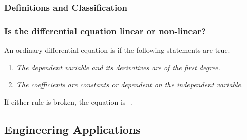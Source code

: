 \documentclass[fleqn]{beamer} %
\newcommand{\sectionIsubsectionItitle}{Definitions and Classification}
\newcommand{\sectionIsubsectionIItitle}{Engineering Applications}
\begin{document}
			\begin{frame}
				\frametitle{\sectionIsubsectionItitle}
				\bigskip

				\frametitle{Is the differential equation linear or non-linear?}

				An ordinary differential equation is \underline{\hspace{30mm}} if the following statements are true. \vspace{5mm}\\

				\begin{enumerate}
				\item {\it The dependent variable and its derivatives are of the first degree.} \vspace{3mm}\\

				\item {\it The coefficients are constants or dependent on the independent variable.}\vspace{3mm}\\
				\end{enumerate}

				If either rule is broken, the equation is \underline{\hspace{10mm}}-\underline{\hspace{30mm}}.
				  
				\btVFill
			\end{frame}



		\subsection{\sectionIsubsectionIItitle}\label{sectionIsubsectionII}
\end{document}
